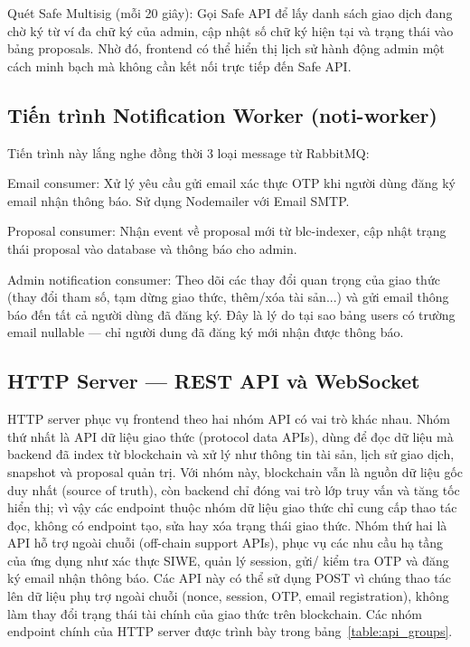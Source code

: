\documentclass[../DoAn.tex]{subfiles}
\begin{document}
Quét Safe Multisig (mỗi 20 giây): Gọi Safe API để lấy danh sách giao dịch đang chờ ký từ ví đa chữ ký của admin, cập nhật số chữ ký hiện tại và trạng thái vào bảng proposals. Nhờ đó, frontend có thể hiển thị lịch sử hành động admin một cách minh bạch mà không cần kết nối trực tiếp đến Safe API.

\subsection{Tiến trình Notification Worker (noti-worker)}


Tiến trình này lắng nghe đồng thời 3 loại message từ RabbitMQ:

Email consumer: Xử lý yêu cầu gửi email xác thực OTP khi người dùng đăng ký email nhận thông báo. Sử dụng Nodemailer với Email SMTP.

Proposal consumer: Nhận event về proposal mới từ blc-indexer, cập nhật trạng thái proposal vào database và thông báo cho admin.

Admin notification consumer: Theo dõi các thay đổi quan trọng của giao thức (thay đổi tham số, tạm dừng giao thức, thêm/xóa tài sản...) và gửi email thông báo đến tất cả người dùng đã đăng ký. Đây là lý do tại sao bảng users có trường email nullable --- chỉ người dung đã đăng ký mới nhận được thông báo.

\subsection{HTTP Server --- REST API và WebSocket}


HTTP server phục vụ frontend theo hai nhóm API có vai trò khác nhau. Nhóm thứ nhất là API dữ liệu giao thức (protocol data APIs), dùng để đọc dữ liệu mà backend đã index từ blockchain và xử lý như thông tin tài sản, lịch sử giao dịch, snapshot và proposal quản trị. Với nhóm này, blockchain vẫn là nguồn dữ liệu gốc duy nhất (source of truth), còn backend chỉ đóng vai trò lớp truy vấn và tăng tốc hiển thị; vì vậy các endpoint thuộc nhóm dữ liệu giao thức chỉ cung cấp thao tác đọc, không có endpoint tạo, sửa hay xóa trạng thái giao thức. Nhóm thứ hai là API hỗ trợ ngoài chuỗi (off-chain support APIs), phục vụ các nhu cầu hạ tầng của ứng dụng như xác thực SIWE, quản lý session, gửi/ kiểm tra OTP và đăng ký email nhận thông báo. Các API này có thể sử dụng POST vì chúng thao tác lên dữ liệu phụ trợ ngoài chuỗi (nonce, session, OTP, email registration), không làm thay đổi trạng thái tài chính của giao thức trên blockchain. Các nhóm endpoint chính của HTTP server được trình bày trong bảng~\ref{table:api_groups}.
\end{document}
